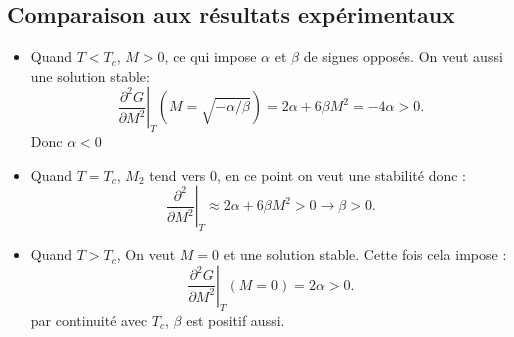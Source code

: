 \documentclass[10pt]{beamer}
\begin{document}
\subsection{Comparaison aux résultats expérimentaux}
\begin{frame}{\insertsubsection}
    \begin{itemize}
        \item Quand $T<T_c$, $M>0$, ce qui impose $\alpha$ et $\beta$ de signes opposés. On veut aussi une solution stable:
        \begin{equation}
            \left.\dfrac{\partial^2G}{\partial M^2}\right|_T(M=\sqrt{-\alpha/\beta})= 2\alpha+6\beta M^2=-4\alpha>0.
        \end{equation}
        Donc $\alpha<0$
        \item Quand $T=T_c$, $M_2$ tend vers 0, en ce point on veut une stabilité donc :
        \begin{equation}
            \left. \dfrac{\partial^2}{\partial M^2}\right|_T\approx 2\alpha+6\beta M^2>0 \rightarrow \beta>0.
        \end{equation}
        \item Quand $T>T_c$, On veut $M=0$ et une solution stable. Cette fois cela impose :
        \begin{equation}
            \left. \dfrac{\partial^2G}{\partial M^2}\right|_T(M=0)=2\alpha>0.
        \end{equation}
        par continuité avec $T_c$, $\beta$ est positif aussi.
    \end{itemize}
\end{frame}
\end{document}
